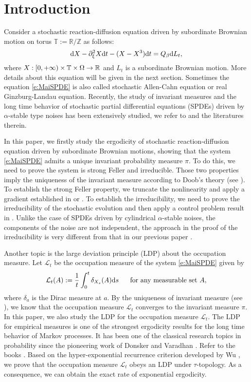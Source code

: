 \documentclass[12pt,a4paper]{article}
\theoremstyle{definition}
\theoremstyle{remark}
\numberwithin{equation}{section}
\newcommand{\eqn}{equation}
\newcommand{\dif}{{\rm d}}
\begin{document}
{\section{Introduction}
 Consider a stochastic reaction-diffusion equation driven by subordinate  Brownian motion on torus $\mathbb T:=\mathbb R/\mathbb Z$ as follows:
\begin{\eqn} \label{e:MaiSPDE}
\dif X-\partial_{\xi}^2X\dif t-(X-X^3)\dif t= Q_{\beta} \dif L_t,
\end{\eqn}
where $X:[0,+\infty)\times \mathbb T\times{\Omega}\rightarrow\mathbb R$ and $L_t$ is a  subordinate  Brownian motion. More details about this equation will be given in the next section. Sometimes the equation \eqref{e:MaiSPDE} is also called stochastic Allen-Cahn equation or real Ginzburg-Landau equation.
Recently,  the study of invariant measures and the long time behavior of stochastic partial differential equations (SPDEs) driven by $\alpha$-stable type noises has been  extensively studied,
we refer to \cite{Do08, DXi11, DXZ09,  FuXi09, Mas} and the literatures therein.

\vskip0.3cm
In this paper, we firstly study  the ergodicity of stochastic reaction-diffusion equation driven by  subordinate Brownian motions, showing that the system \eqref{e:MaiSPDE} admits a unique invariant probability measure $\pi$. To do this, we need to prove the system is  strong Feller and irreducible. Those two properties imply the uniqueness of the invariant measure according to Doob's theory (see \cite{Doob}).  To establish the strong Feller property, we truncate the nonlinearity and apply a gradient established in \cite{DXZ14JSP} or \cite{Zh}.   To establish the irreducibility, we  need to prove the irreducibility of the stochastic evolution and then apply a control problem result in \cite{WXX}. Unlike the case of SPDEs driven by cylindrical $\alpha$-stable noises,  the components of the noise are not independent, the approach in the proof of the irreducibility   is  very different from that in our previous paper \cite{WXX}.


\vskip0.3cm
 Another topic is the large deviation principle (LDP) about the occupation measure. Let $\mathcal L_t$ be the occupation measure of the system \eqref{e:MaiSPDE}  given by
\begin{equation}\label{e:occupation1}
\mathcal L_t(A):=\frac1t\int_0^t\delta_{X_s}(A)\dif s \ \ \  \ \text{ for any measurable set } A,
\end{equation}
where $\delta_a$ is the Dirac measure at $a$.  By the uniqueness of invariant measure  (see \cite{DPZ96}), we know that the occupation measure $ \mathcal L_t$ converges to the invariant measure $\pi$. In this paper, we also study  the LDP for the occupation measure $\mathcal L_t$.  The LDP for empirical measures is one of the strongest ergodicity results
for the long time behavior of Markov processes. It has been one of the classical research
topics in probability since the pioneering work of Donsker and Varadhan \cite{DV}. Refer to the books \cite{DZ,DS}.
Based on the hyper-exponential recurrence criterion developed by Wu \cite{Wu01}, we  prove that the occupation measure $\mathcal L_t$ obeys an LDP under $\tau$-topology.  As a consequence, we  can obtain the exact rate of exponential ergodicity.


}
\end{document}
